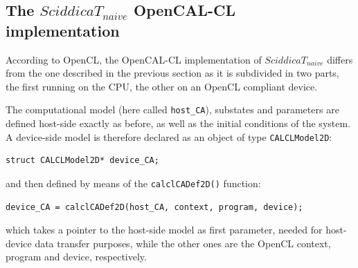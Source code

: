 \subsection{The $SciddicaT_{naive}$ OpenCAL-CL implementation}
\label{sec:sciddica_cl}
According to OpenCL, the OpenCAL-CL implementation of
$SciddicaT_{naive}$ differs from the one described in the previous
section as it is subdivided in two parts, the first running on the
CPU, the other on an OpenCL compliant device.

The computational model (here called \verb'host_CA'), substates and
parameters are defined host-side exactly as before, as well as the
initial conditions of the system. A device-side model is therefore
declared as an object of type \verb'CALCLModel2D':

\begin{lstlisting}
struct CALCLModel2D* device_CA;
\end{lstlisting}

\noindent and then defined by means of the \verb'calclCADef2D()'
function:

\begin{lstlisting}
device_CA = calclCADef2D(host_CA, context, program, device);
\end{lstlisting}

\noindent which takes a pointer to the host-side model as first
parameter, needed for host-device data transfer purposes, while the
other ones are the OpenCL context, program and device, respectively.

